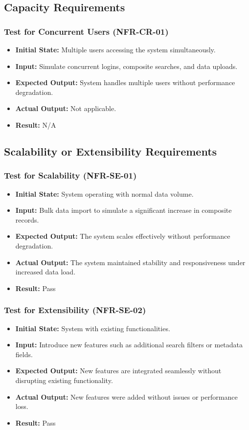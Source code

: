 \documentclass[12pt, titlepage]{article}
\begin{document}
\subsection{Capacity Requirements}

\subsubsection{Test for Concurrent Users (NFR-CR-01)}
\begin{itemize}
    \item \textbf{Initial State: }Multiple users accessing the system simultaneously.
    \item \textbf{Input: }Simulate concurrent logins, composite searches, and data uploads.
    \item \textbf{Expected Output: }System handles multiple users without performance degradation.
    \item \textbf{Actual Output: }Not applicable.
    \item \textbf{Result: }N/A
\end{itemize}

\subsection{Scalability or Extensibility Requirements}

\subsubsection{Test for Scalability (NFR-SE-01)}
\begin{itemize}
    \item \textbf{Initial State: }System operating with normal data volume.
    \item \textbf{Input: }Bulk data import to simulate a significant increase in composite records.
    \item \textbf{Expected Output: }The system scales effectively without performance degradation.
    \item \textbf{Actual Output: }The system maintained stability and responsiveness under increased data load.
    \item \textbf{Result: }Pass
\end{itemize}

\subsubsection{Test for Extensibility (NFR-SE-02)}
\begin{itemize}
    \item \textbf{Initial State: }System with existing functionalities.
    \item \textbf{Input: }Introduce new features such as additional search filters or metadata fields.
    \item \textbf{Expected Output: }New features are integrated seamlessly without disrupting existing functionality.
    \item \textbf{Actual Output: }New features were added without issues or performance loss.
    \item \textbf{Result: }Pass
\end{itemize}
\end{document}
